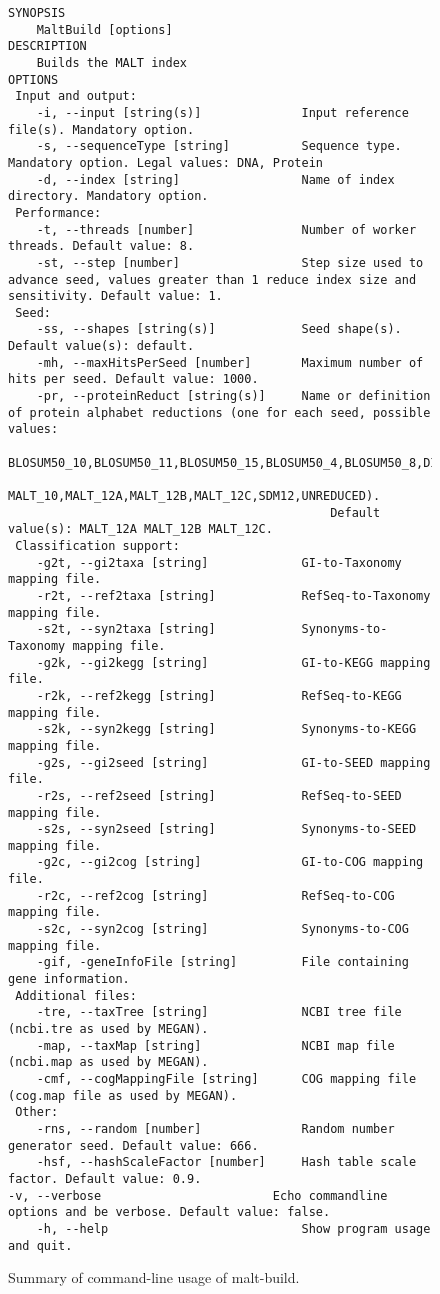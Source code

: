 \documentclass[11pt]{article}
\begin{document}
\begin{figure}[h]
{\tiny
\begin{verbatim}
SYNOPSIS
	MaltBuild [options]
DESCRIPTION
	Builds the MALT index
OPTIONS
 Input and output:
	-i, --input [string(s)]              Input reference file(s). Mandatory option.
	-s, --sequenceType [string]          Sequence type. Mandatory option. Legal values: DNA, Protein
	-d, --index [string]                 Name of index directory. Mandatory option.
 Performance:
	-t, --threads [number]               Number of worker threads. Default value: 8.
	-st, --step [number]                 Step size used to advance seed, values greater than 1 reduce index size and sensitivity. Default value: 1.
 Seed:
	-ss, --shapes [string(s)]            Seed shape(s). Default value(s): default.
	-mh, --maxHitsPerSeed [number]       Maximum number of hits per seed. Default value: 1000.
	-pr, --proteinReduct [string(s)]     Name or definition of protein alphabet reductions (one for each seed, possible values:
                                             BLOSUM50_10,BLOSUM50_11,BLOSUM50_15,BLOSUM50_4,BLOSUM50_8,DIAMOND_11,GBMR4,HSDM17,
                                             MALT_10,MALT_12A,MALT_12B,MALT_12C,SDM12,UNREDUCED).
                                             Default value(s): MALT_12A MALT_12B MALT_12C.
 Classification support:
	-g2t, --gi2taxa [string]             GI-to-Taxonomy mapping file. 
	-r2t, --ref2taxa [string]            RefSeq-to-Taxonomy mapping file. 
	-s2t, --syn2taxa [string]            Synonyms-to-Taxonomy mapping file. 
	-g2k, --gi2kegg [string]             GI-to-KEGG mapping file. 
	-r2k, --ref2kegg [string]            RefSeq-to-KEGG mapping file. 
	-s2k, --syn2kegg [string]            Synonyms-to-KEGG mapping file. 
	-g2s, --gi2seed [string]             GI-to-SEED mapping file. 
	-r2s, --ref2seed [string]            RefSeq-to-SEED mapping file. 
	-s2s, --syn2seed [string]            Synonyms-to-SEED mapping file. 
	-g2c, --gi2cog [string]              GI-to-COG mapping file. 
	-r2c, --ref2cog [string]             RefSeq-to-COG mapping file. 
	-s2c, --syn2cog [string]             Synonyms-to-COG mapping file. 
	-gif, -geneInfoFile [string]         File containing gene information. 
 Additional files:
	-tre, --taxTree [string]             NCBI tree file (ncbi.tre as used by MEGAN). 
	-map, --taxMap [string]              NCBI map file (ncbi.map as used by MEGAN). 
	-cmf, --cogMappingFile [string]      COG mapping file (cog.map file as used by MEGAN). 
 Other:
	-rns, --random [number]              Random number generator seed. Default value: 666.
	-hsf, --hashScaleFactor [number]     Hash table scale factor. Default value: 0.9.
-v, --verbose                        Echo commandline options and be verbose. Default value: false.
	-h, --help                           Show program usage and quit.
\end{verbatim}
}
\caption{Summary of command-line usage of malt-build.}\label{fig:malt-build-usage}
\end{figure}
\end{document}
